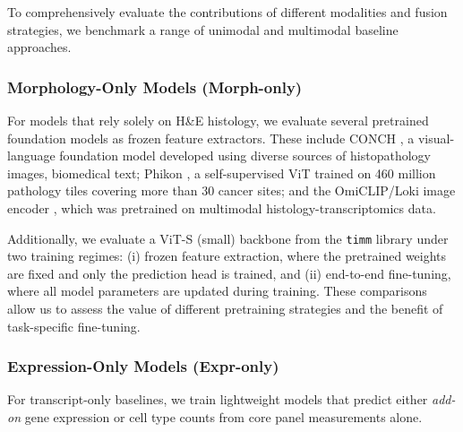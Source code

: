 To comprehensively evaluate the contributions of different modalities and fusion strategies, we benchmark a range of unimodal and multimodal baseline approaches.

\subsubsection{Morphology-Only Models (Morph-only)}
\label{sec:morphology-only-models-morph-only}

For models that rely solely on H\&E histology, we evaluate several pretrained foundation models as frozen feature extractors. These include CONCH \cite{lu_multimodalgenerativeai_2024}, a visual-language foundation model developed using diverse sources of histopathology images, biomedical text; Phikon \cite{filiot_phikonv2largepublic_2024}, a self-supervised ViT trained on 460 million pathology tiles covering more than 30 cancer sites; and the OmiCLIP/Loki image encoder \cite{chen_visualomicsfoundation_2025}, which was pretrained on multimodal histology-transcriptomics data. 

Additionally, we evaluate a ViT-S (small) backbone from the \texttt{timm} library under two training regimes: (i) frozen feature extraction, where the pretrained weights are fixed and only the prediction head is trained, and (ii) end-to-end fine-tuning, where all model parameters are updated during training. These comparisons allow us to assess the value of different pretraining strategies and the benefit of task-specific fine-tuning.

\subsubsection{Expression-Only Models (Expr-only)}
\label{sec:expression-only-models-expr-only}

For transcript-only baselines, we train lightweight models that predict either \emph{add-on} gene expression or cell type counts from core panel measurements alone.

